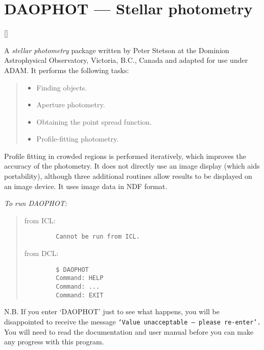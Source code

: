 \newpage

\section{DAOPHOT --- Stellar photometry}

\vspace{-11mm}

\hfill []

\vspace{5mm}

A {\em stellar photometry} package written by Peter Stetson at the Dominion
Astrophysical Observatory, Victoria, B.C., Canada and adapted for use under
ADAM.
It performs the following tasks:

{\small
\begin{quote}
\begin{itemize}
\item Finding objects.
\item Aperture photometry.
\item Obtaining the point spread function.
\item Profile-fitting photometry.
\end{itemize}
\end{quote}

}
Profile fitting in crowded regions is performed iteratively, which improves the
accuracy of the photometry.
It does not directly use an image display (which aids portability), although
three additional routines allow results to be displayed on an image device.
It uses image data in NDF format.

{\em To run DAOPHOT:}\hfill
\begin{quote}
\begin{description}

\item [from ICL:] \hfill

\begin{small}
\begin{verbatim}
   Cannot be run from ICL.
\end{verbatim}
\end{small}

\item [from DCL:] \hfill

\begin{small}
\begin{verbatim}
   $ DAOPHOT
   Command: HELP
   Command: ...
   Command: EXIT
\end{verbatim}
\end{small}

\end{description}
\end{quote}
N.B. If you enter `DAOPHOT' just to see what happens, you will be disappointed
to receive the message {\tt `Value unacceptable --- please re-enter'.}
You will need to read the documentation and user manual before you can
make any progress with this program.


